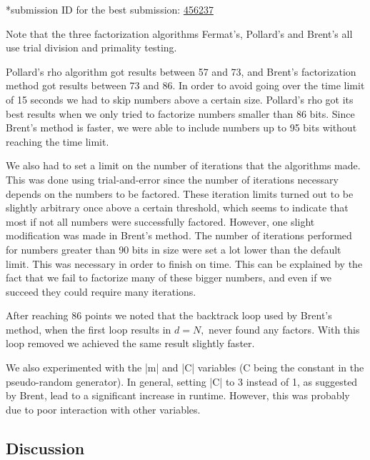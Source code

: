 \documentclass[paper=a4, fontsize=11pt,numbers=endperiod]{scrartcl} %
\numberwithin{equation}{section} %
\numberwithin{figure}{section} %
\numberwithin{table}{section} %
\begin{document}
    \footnotesize{*submission ID for the best submission: \href{https://kth.kattis.scrool.se/submission?id=456237}{456237}
    \normalsize

Note that the three factorization algorithms Fermat's, Pollard's and Brent's all use trial division and primality testing.

Pollard's rho algorithm got results between 57 and 73, and Brent's factorization method got results between 73 and 86.
In order to avoid going over the time limit of 15 seconds we had to skip numbers above a certain size.
Pollard's rho got its best results when we only tried to factorize numbers smaller than 86 bits.
Since Brent's method is faster, we were able to include numbers up to 95 bits without reaching the time limit.

We also had to set a limit on the number of iterations that the algorithms made.
This was done using trial-and-error since the number of iterations necessary depends on the numbers to be factored.
These iteration limits turned out to be slightly arbitrary once above a certain threshold, which seems to indicate that most if not all numbers were successfully factored.
However, one slight modification was made in Brent's method.
The number of iterations performed for numbers greater than 90 bits in size were set a lot lower than the default limit.
This was necessary in order to finish on time.
This can be explained by the fact that we fail to factorize many of these bigger numbers, 
and even if we succeed they could require many iterations.

After reaching 86 points we noted that the backtrack loop used by Brent's method, when the first loop results in $d = N,$ never found any factors.
With this loop removed we achieved the same result slightly faster.

We also experimented with the |m| and |C| variables (C being the constant in the pseudo-random generator).
In general, setting |C| to 3 instead of 1, as suggested by Brent, lead to a significant increase in runtime.
However, this was probably due to poor interaction with other variables.



\subsection{Discussion}

}
\end{document}
